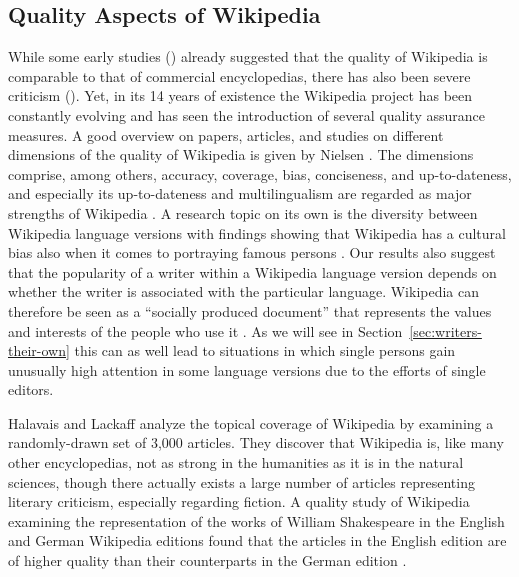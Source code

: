 \documentclass[a4paper,12pt]{scrartcl}
\begin{document}
\subsection{Quality Aspects of Wikipedia}
\enlargethispage{\baselineskip}

While some early studies (\eg \cite{giles2005nature}) already
suggested that the quality of Wikipedia is comparable to that of
commercial encyclopedias, there has also been severe criticism
(\eg \cite{black20110wikipedia}). Yet, in its 14 years of
existence the Wikipedia project has been constantly evolving and
has seen the introduction of several quality assurance measures.
%
%
A good overview on papers, articles, and studies on different
dimensions of the quality of Wikipedia is given by Nielsen
\cite{Nielsen2013WikipediaResearchReport}. The dimensions comprise,
among others, accuracy, coverage, bias, conciseness, and
up-to-dateness, and especially its up-to-dateness and multilingualism
are regarded as major strengths
of Wikipedia \cite{hammwoehner2007Qualitaetsaspekte}.
%
A research topic on its own is the diversity between Wikipedia
language versions
\cite{Bao2012Omnipedia,hecht2010babel,Callahan2011culturalbias} with
findings showing that Wikipedia has a cultural bias also when it comes
to portraying famous persons \cite{Callahan2011culturalbias}.
Our results also suggest that the popularity of a writer within a
Wikipedia language version depends on whether the writer is associated
with the particular language. Wikipedia can therefore be seen as a
``socially produced document'' that represents the values and
interests of the people who use it \cite{royal2009Completeness}. As we
will see in Section~\ref{sec:writers-their-own} this can as well lead
to situations in which single persons gain unusually high attention in
some language versions due to the efforts of single editors.

Halavais and Lackaff \cite{halavais2008TopicalCoverage} analyze the
topical coverage of Wikipedia by examining a randomly-drawn set of
3,000 articles. They discover that Wikipedia is, like many other
encyclopedias, not as strong in the %
humanities as it is in the natural
sciences, though there actually exists a large number of articles
representing literary criticism, especially regarding fiction.
%
A quality study of Wikipedia examining the representation of the works
of William Shakespeare in the English and German Wikipedia editions
found that the articles in the English edition are of higher quality
than their counterparts in the German edition
\cite{hammwoehner2007Qualitaetsaspekte}.
\end{document}
